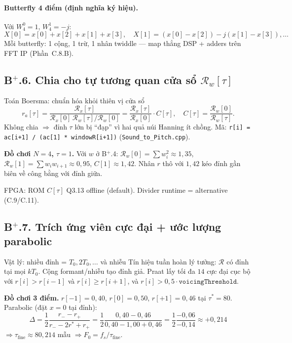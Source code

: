 \paragraph{Butterfly 4 điểm (định nghĩa ký hiệu).}
Với $W_4^0=1$, $W_4^1=-j$:
\[
X[0]=x[0]+x[2]+x[1]+x[3],\quad
X[1]=(x[0]-x[2])-j(x[1]-x[3]),\ldots
\]
Mỗi butterfly: 1 cộng, 1 trừ, 1 nhân twiddle --- map thẳng DSP + adders trên FFT IP (Phần~C.8.B).

\subsection*{B$^+$.6. Chia cho tự tương quan cửa sổ $\mathcal{R}_w[\tau]$}

\begin{firstprin}{Toán Boersma: chuẩn hóa khỏi thiên vị cửa sổ}
\[
r_a[\tau]=\frac{\mathcal{R}_x[\tau]}{\mathcal{R}_x[0]\,\mathcal{R}_w[\tau]/\mathcal{R}_w[0]}
=\frac{\mathcal{R}_x[\tau]}{\mathcal{R}_x[0]}\cdot C[\tau],\quad
C[\tau]=\frac{\mathcal{R}_w[0]}{\mathcal{R}_w[\tau]}.
\]
Không chia $\Rightarrow$ đỉnh $\tau$ lớn bị ``đạp'' vì hai quả núi Hanning ít chồng. Mã: \texttt{r[i] = ac[i+1] / (ac[1] * windowR[i+1])} (\texttt{Sound\_to\_Pitch.cpp}).
\end{firstprin}

\noindent\textbf{Đồ chơi $N=4$, $\tau=1$.} Với $w$ ở B$^+$.4:
$\mathcal{R}_w[0]=\sum w_i^2\approx 1{,}35$, $\mathcal{R}_w[1]=\sum w_i w_{i+1}\approx 0{,}95$, $C[1]\approx1{,}42$.
Nhân $r$ thô với $1{,}42$ kéo đỉnh gần biên về công bằng với đỉnh giữa.

\begin{costbox}
FPGA: ROM $C[\tau]$ Q3.13 offline (default). Divider runtime = alternative (C.9/C.11).
\end{costbox}

\subsection*{B$^+$.7. Trích ứng viên cực đại + ước lượng parabolic}

\begin{firstprin}{Vật lý: nhiều đỉnh = $T_0,2T_0,\ldots$ và nhiễu}
Tín hiệu tuần hoàn lý tưởng: $\mathcal{R}$ có đỉnh tại mọi $kT_0$. Cộng formant/nhiễu tạo đỉnh giả. Praat lấy tối đa $14$ cực đại cục bộ với $r[i]>r[i-1]$ và $r[i]\ge r[i+1]$, và $r[i] > 0{,}5\cdot\texttt{voicingThreshold}$.
\end{firstprin}

\noindent\textbf{Đồ chơi 3 điểm.} $r[-1]=0{,}40$, $r[0]=0{,}50$, $r[+1]=0{,}46$ tại $\tau^*=80$.
Parabolic (đặt $x=0$ tại đỉnh):
\[
\Delta = \frac12\frac{r_{-}-r_{+}}{r_{-}-2r^{*}+r_{+}}
= \frac12\frac{0{,}40-0{,}46}{0{,}40-1{,}00+0{,}46}
= \frac12\frac{-0{,}06}{-0{,}14}\approx +0{,}214
\]
$\Rightarrow \tau_{\mathrm{fine}}\approx80{,}214$ mẫu $\Rightarrow F_0=f_s/\tau_{\mathrm{fine}}$.

